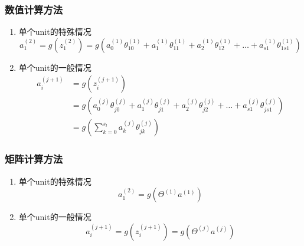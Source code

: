 \subsubsection{数值计算方法}
\begin{enumerate}
\item 单个unit的特殊情况
\begin{equation}
	a_1^{(2)} = g(z_1^{(2)}) = g(a_0^{(1)}\theta_{10}^{(1)}
	+ a_1^{(1)}\theta_{11}^{(1)}
	+ a_2^{(1)}\theta_{12}^{(1)}
	+ \dots
	+ a_{s1}^{(1)}\theta_{1s1}^{(1)})
\end{equation}

\item 单个unit的一般情况
\begin{equation} \begin{aligned}
	a_i^{(j+1)} &= g(z_i^{(j+1)})
	\\ & = g(a_0^{(j)}\theta_{j0}^{(j)} + a_{1}^{(j)}\theta_{j1}^{(j)} + a_2^{(j)}\theta_{j2}^{(j)} + \dots + a_{s1}^{(j)}\theta_{js1}^{(j)})
	\\ &= g(\sum_{k=0}^{s_l}{a_k^{(j)}\theta_{jk}^{(j)}})
\end{aligned}\end{equation}
\end{enumerate}

\subsubsection{矩阵计算方法}
\begin{enumerate}
\item 单个unit的特殊情况
\begin{equation}
	a_1^{(2)} = g(\Theta^{(1)} a^{(1)})
\end{equation}

\item 单个unit的一般情况
\begin{equation}
	a_i^{(j+1)} = g(z_i^{(j+1)}) = g(\Theta^{(j)} a^{(j)})
\end{equation}


\end{enumerate}







